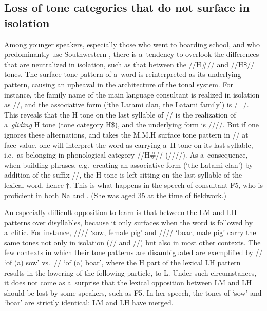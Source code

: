 \subsection{Loss of tone categories that do not surface in isolation}
\label{sec:thelossoftonecategoriesnotreflectedinsurfaceformsinisolation}

Among younger speakers, especially those who went to boarding school, and who predominantly use Southwestern , there is a~tendency to overlook
the differences that are neutralized in isolation, such as that between the \mbox{//H\#//} and \mbox{//H\$//} tones. The surface tone
pattern of a~word is reinterpreted as its underlying pattern, causing an upheaval in the architecture of the tonal system. For instance, the family name of the main language consultant is realized in isolation as
//, and the {associative} form (‘the
Latami clan, the Latami family’) is /=/. This reveals that the H tone on the last syllable of // is the realization of a~\textit{gliding} H tone (tone category H\$), and the underlying form is ////. But if one ignores these alternations, and takes the M.M.H surface tone pattern in // at face value, one will interpret the word as carrying a~H tone on its last syllable, i.e.\ as belonging in phonological category \mbox{//H\#//} (////). As a~consequence, when building phrases, e.g.~creating an {associative} form (‘the
Latami clan’) by addition of the suffix
//, the H tone is left sitting on the last syllable of the lexical word, hence $\dagger$. This is what happens in the speech of consultant F5, who is proficient in both Na and . (She was aged 35 at the time of fieldwork.)

An especially difficult opposition to learn is that between the LM and
LH patterns over disyllables, because it only surfaces when the word
is followed by a~clitic. For instance, //// ‘sow,
female pig’ and //// ‘boar, male pig’ carry the same tones
not only in isolation (// and //) but also in most other contexts. The few
contexts in which their tone patterns are disambiguated are exemplified by
// ‘of (a) sow’ vs.\ //
‘of (a) boar’, where the H part of the lexical LH pattern
results in the lowering of the following  particle, to L. Under such circumstances, it does not come as a~surprise that the lexical opposition between LM and LH
should be lost by some speakers, such as F5. In her
speech, the tones of ‘sow’ and ‘boar’ are strictly identical: LM and LH have merged.



